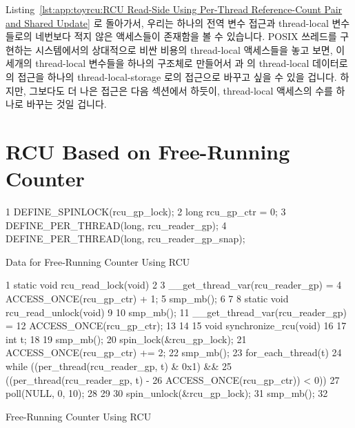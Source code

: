 Listing~\ref{lst:app:toyrcu:RCU Read-Side Using Per-Thread Reference-Count Pair and Shared Update}
로 돌아가서, 우리는 하나의 전역 변수 접근과 thread-local 변수들로의 네번보다
적지 않은 액세스들이 존재함을 볼 수 있습니다.
POSIX 쓰레드를 구현하는 시스템에서의 상대적으로 비싼 비용의 thread-local
액세스들을 놓고 보면, 이 세개의 thread-local 변수들을 하나의 구조체로 만들어서
 과  의 thread-local 데이터로의
접근을 하나의 thread-local-storage 로의 접근으로 바꾸고 싶을 수 있을 겁니다.
하지만, 그보다도 더 나은 접근은 다음 섹션에서 하듯이, thread-local 액세스의
수를 하나로 바꾸는 것일 겁니다.
\iffalse

Referring back to
Listing~\ref{lst:app:toyrcu:RCU Read-Side Using Per-Thread Reference-Count Pair and Shared Update},
we see that there is one global-variable access and no fewer than four
accesses to thread-local variables.
Given the relatively high cost of thread-local accesses on systems
implementing POSIX threads, it is tempting to collapse the three
thread-local variables into a single structure, permitting
\co{rcu_read_lock()} and \co{rcu_read_unlock()} to access their
thread-local data with a single thread-local-storage access.
However, an even better approach would be to reduce the number of
thread-local accesses to one, as is done in the next section.
\fi

\section{RCU Based on Free-Running Counter}
\label{sec:app:toyrcu:RCU Based on Free-Running Counter}

\begin{listing}[tbp]
{ \scriptsize
\begin{verbbox}
  1 DEFINE_SPINLOCK(rcu_gp_lock);
  2 long rcu_gp_ctr = 0;
  3 DEFINE_PER_THREAD(long, rcu_reader_gp);
  4 DEFINE_PER_THREAD(long, rcu_reader_gp_snap);
\end{verbbox}
}
\centering
\theverbbox
\caption{Data for Free-Running Counter Using RCU}
\label{lst:app:toyrcu:Data for Free-Running Counter Using RCU}
\end{listing}

\begin{listing}[tbp]
{ \scriptsize
\begin{verbbox}
 1 static void rcu_read_lock(void)
 2 {
 3   __get_thread_var(rcu_reader_gp) =
 4     ACCESS_ONCE(rcu_gp_ctr) + 1;
 5   smp_mb();
 6 }
 7 
 8 static void rcu_read_unlock(void)
 9 {
10   smp_mb();
11   __get_thread_var(rcu_reader_gp) =
12     ACCESS_ONCE(rcu_gp_ctr);
13 }
14 
15 void synchronize_rcu(void)
16 {
17   int t;
18 
19   smp_mb();
20   spin_lock(&rcu_gp_lock);
21   ACCESS_ONCE(rcu_gp_ctr) += 2;
22   smp_mb();
23   for_each_thread(t) {
24     while ((per_thread(rcu_reader_gp, t) & 0x1) &&
25             ((per_thread(rcu_reader_gp, t) -
26               ACCESS_ONCE(rcu_gp_ctr)) < 0)) {
27       poll(NULL, 0, 10);
28     }
29   }
30   spin_unlock(&rcu_gp_lock);
31   smp_mb();
32 }
\end{verbbox}
}
\centering
\theverbbox
\caption{Free-Running Counter Using RCU}
\label{lst:app:toyrcu:Free-Running Counter Using RCU}
\end{listing}

